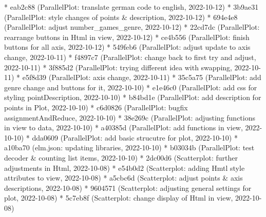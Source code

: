 \documentclass[usegeometry=true]{scrartcl}
\begin{document}
* eab2c88 (ParallelPlot: translate german code to english, 2022-10-12)\newline
* 3b9ae31 (ParallelPlot: style changes of points \& description, 2022-10-12)\newline
* 694e4e8 (ParallelPlot: adjust number\_games\_genre, 2022-10-12)\newline
* 22cd7dc (ParallelPlot: rearrange buttons in Html in view, 2022-10-12)\newline
* ce4b556 (ParallelPlot: finish buttons for all axis, 2022-10-12)\newline
* 549feb6 (ParallelPlot: adjust update to axis change, 2022-10-11)\newline
* f4897c7 (ParallelPlot: change back to first try and adjust, 2022-10-11)\newline
* 3f885d2 (ParallelPlot: trying different idea with swapping, 2022-10-11)\newline
* e5f8d39 (ParallelPlot: axis change, 2022-10-11)\newline
* 35c5a75 (ParallelPlot: add genre change and buttons for it, 2022-10-10) \newline
* e1e46c0 (ParallelPlot: add css for styling pointDescription, 2022-10-10)\newline
* b84bd1e (ParallelPlot: add description for points in Plot, 2022-10-10)\newline
* c6d0826 (ParallelPlot: bugfix assignmentAndReduce, 2022-10-10)\newline
* 38e269c (ParallelPlot: adjusting functions in view to data, 2022-10-10)\newline
* a40385d (ParallelPlot: add functions in view, 2022-10-10)\newline
* dda0609 (ParallelPlot: add basic strucutre for plot, 2022-10-10)\newline
* a10ba70 (elm.json: updating libraries, 2022-10-10)\newline
* b03034b (ParallelPlot: test decoder \& counting list items, 2022-10-10)\newline
* 2dc00d6 (Scatterplot: further adjustments in Html, 2022-10-08)\newline
* e54b0d2 (Scatterplot: adding Hmtl style attributes to view, 2022-10-08) \newline
* a5cbc6d (Scatterplot: adjust points \& axis descriptions, 2022-10-08)\newline
* 9604571 (Scatterplot: adjusting general settings for plot, 2022-10-08)\newline
* 5c7eb8f (Scatterplot: change display of Html in view, 2022-10-08)\newline
\end{document}
